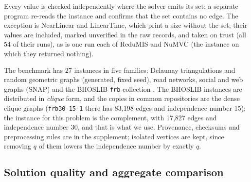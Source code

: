 \documentclass[review,authoryear,11pt]{elsarticle}
\theoremstyle{definition}
\begin{document}
Every value is checked independently where the solver emits its set: a separate
program re-reads the instance and confirms that the set contains no edge. The
exception is NearLinear and LinearTime, which print a size without the set; their
values are included, marked unverified in the raw records, and taken on trust (all 54
of their runs), as is one run each of ReduMIS and NuMVC (the instance on which they
returned nothing).

The benchmark has 27 instances in five families: Delaunay triangulations and random
geometric graphs (generated, fixed seed), road networks, social and web graphs (SNAP)
and the BHOSLIB \texttt{frb} collection \citep{xu2007}. The BHOSLIB instances are
distributed in \emph{clique} form, and the copies in common repositories are the
dense clique graphs (\texttt{frb30-15-1} there has 83,198 edges and independence
number 15); the instance for this problem is the complement, with 17,827 edges and
independence number 30, and that is what we use. Provenance, checksums and
preprocessing rules are in the supplement; isolated vertices are kept, since removing
$q$ of them lowers the independence number by exactly $q$.





\subsection{Solution quality and aggregate comparison}
\end{document}
